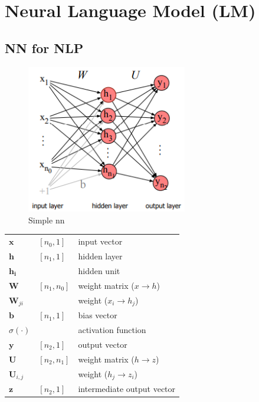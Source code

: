 \chapter{Neural Language Model (LM)}

\section{NN for NLP \cite{nlp-1}}

\begin{table}[H]
    \begin{minipage}{0.45\linewidth}
        \begin{figure}[H]
            \centering
            \includegraphics[height=6.5cm]{Pictures/nlp/simple-nn-nlp.png}
            \caption{Simple nn}
        \end{figure}
    \end{minipage}
    \hfill
    \begin{minipage}{0.45\linewidth}
        \begin{customTableWrapper}{1}
        \begin{table}[H]
            \begin{tabular}{l l l}
                 $\mathbf{x}$ & $[n_0, 1]$ & input vector \\
                 $\mathbf{h}$ & $[n_1, 1]$ & hidden layer \\
                 $\mathbf{h_i}$ &  & hidden unit \\
                 $\mathbf{W}$ & $[n_1, n_0]$ & weight matrix  ($x \rightarrow h$) \\
                 $\mathbf{W}_{ji}$ &  & weight ($x_i \rightarrow h_j$) \\
                 $\mathbf{b}$ & $[n_1, 1]$ & bias vector \\
                 $\sigma(\cdot)$ & & activation function \\
                 $\mathbf{y}$ & $[n_2, 1]$ & output vector \\
                 $\mathbf{U}$ & $[n_2, n_1]$ & weight matrix ($h \rightarrow z$) \\
                 $\mathbf{U}_{i,j}$ & & weight ($h_j \rightarrow z_i$) \\
                 $\mathbf{z}$ & $[n_2, 1]$ & intermediate output vector \\
            \end{tabular}
        \end{table}
        \end{customTableWrapper}
    \end{minipage}
\end{table}
